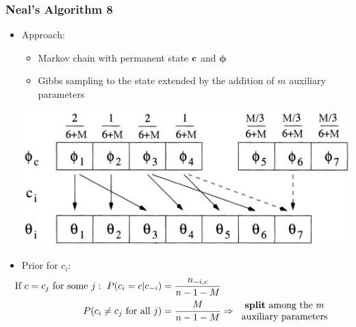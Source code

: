 \begin{frame} %
	\frametitle{Neal's Algorithm 8}
	\begin{itemize}
		\item Approach:
		\begin{itemize}
		    \item Markov chain with permanent state $\textbf c$ and $\boldsymbol\phi$ %
		    \item Gibbs sampling to the state extended by the addition of $m$ auxiliary parameters \\
        \end{itemize}
        \begin{center}
        	\includegraphics[scale=0.29]{etc/neal8.png}
        \end{center}
		
        \item Prior for $c_{i}$:
            \begin{align*}
            \hspace{-25pt}
            \vspace{-10pt}
                \text{If} \ c=c_{j} \ \text{for some } j: \ P(c_{i}=c | c_{-i}) &= \frac{n_{-i,c}}{n-1-M}  \\
                P(c_{i}\neq c_{j} \text{ for all } j) &=\frac{M }{n-1-M}  \Rightarrow 
                \begin{tabular}{c}
                \textbf{split} among the $m$ \\
                auxiliary parameters 
                \end{tabular}
            \end{align*}	
	\end{itemize}
\end{frame}




